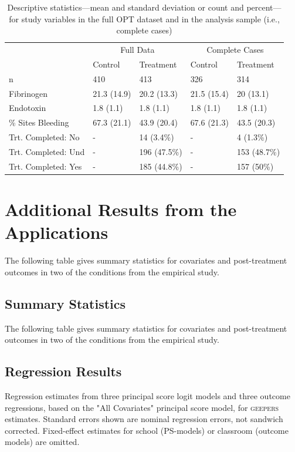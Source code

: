 \documentclass[]{article}
\begin{document}
\begin{table}

\caption{\label{tab:optTab1}Descriptive statistics---mean and standard deviation or count and percent---for study variables in the full OPT dataset and in the analysis sample (i.e., complete cases)}
\centering
\begin{tabular}[t]{lllll}
\toprule
\multicolumn{1}{c}{ } & \multicolumn{2}{c}{Full Data} & \multicolumn{2}{c}{Complete Cases} \\
\cmidrule(l{3pt}r{3pt}){2-3} \cmidrule(l{3pt}r{3pt}){4-5}
  & Control & Treatment & Control & Treatment\\
\midrule
n & 410 & 413 & 326 & 314\\
Fibrinogen & 21.3 (14.9) & 20.2 (13.3) & 21.5 (15.4) & 20 (13.1)\\
Endotoxin & 1.8 (1.1) & 1.8 (1.1) & 1.8 (1.1) & 1.8 (1.1)\\
\% Sites Bleeding & 67.3 (21.1) & 43.9 (20.4) & 67.6 (21.3) & 43.5 (20.3)\\
Trt. Completed: No & - & 14 (3.4\%) & - & 4 (1.3\%)\\
\addlinespace
Trt. Completed: Und & - & 196 (47.5\%) & - & 153 (48.7\%)\\
Trt. Completed: Yes & - & 185 (44.8\%) & - & 157 (50\%)\\
\bottomrule
\end{tabular}
\end{table}

\section{Additional Results from the Applications}
\singlespacing
The following table gives summary statistics for covariates and post-treatment outcomes in two of the conditions from the empirical study.\\


\subsection{Summary Statistics}
The following table gives summary statistics for covariates and post-treatment outcomes in two of the conditions from the empirical study.\\
\small

\clearpage

\small


\subsection{Regression Results}
Regression estimates from three principal score logit models and three outcome regressions, based on the "All Covariates" principal score model, for \textsc{geepers} estimates. Standard errors shown are nominal regression errors, not sandwich corrected. Fixed-effect estimates for school (PS-models) or classroom (outcome models) are omitted.

\small
%




\end{document}
